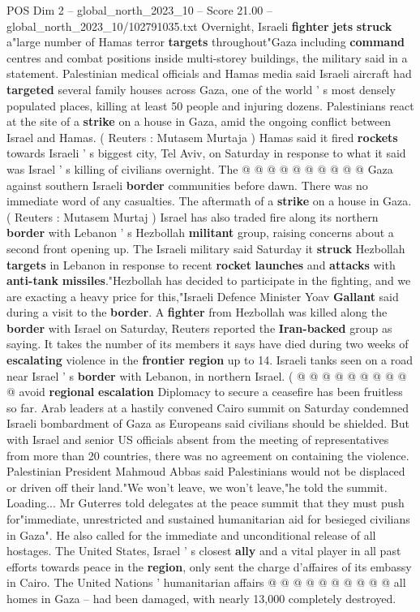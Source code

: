\begin{textsample}{POS Dim 2 – global\_north\_2023\_10 – Score 21.00 – global\_north\_2023\_10/102791035.txt}
Overnight, Israeli \textbf{fighter} \textbf{jets} \textbf{struck} a"large number of Hamas terror \textbf{targets} throughout"Gaza including \textbf{command} centres and combat positions inside multi-storey buildings, the military said in a statement.
Palestinian medical officials and Hamas media said Israeli aircraft had \textbf{targeted} several family houses across Gaza, one of the world ' s most densely populated places, killing at least 50 people and injuring dozens.
Palestinians react at the site of a \textbf{strike} on a house in Gaza, amid the ongoing conflict between Israel and Hamas. ( Reuters : Mutasem Murtaja ) Hamas said it fired \textbf{rockets} towards Israeli ' s biggest city, Tel Aviv, on Saturday in response to what it said was Israel ' s killing of civilians overnight.
The @ @ @ @ @ @ @ @ @ @ Gaza against southern Israeli \textbf{border} communities before dawn.
There was no immediate word of any casualties.
The aftermath of a \textbf{strike} on a house in Gaza. ( Reuters : Mutasem Murtaj ) Israel has also traded fire along its northern \textbf{border} with Lebanon ' s Hezbollah \textbf{militant} group, raising concerns about a second front opening up.
The Israeli military said Saturday it \textbf{struck} Hezbollah \textbf{targets} in Lebanon in response to recent \textbf{rocket} \textbf{launches} and \textbf{attacks} with \textbf{anti-tank} \textbf{missiles}."Hezbollah has decided to participate in the fighting, and we are exacting a heavy price for this,"Israeli Defence Minister Yoav \textbf{Gallant} said during a visit to the \textbf{border}.
A \textbf{fighter} from Hezbollah was killed along the \textbf{border} with Israel on Saturday, Reuters reported the \textbf{Iran-backed} group as saying.
It takes the number of its members it says have died during two weeks of \textbf{escalating} violence in the \textbf{frontier} \textbf{region} up to 14.
Israeli tanks seen on a road near Israel ' s \textbf{border} with Lebanon, in northern Israel. ( @ @ @ @ @ @ @ @ @ @ avoid \textbf{regional} \textbf{escalation} Diplomacy to secure a ceasefire has been fruitless so far.
Arab leaders at a hastily convened Cairo summit on Saturday condemned Israeli bombardment of Gaza as Europeans said civilians should be shielded.
But with Israel and senior US officials absent from the meeting of representatives from more than 20 countries, there was no agreement on containing the violence.
Palestinian President Mahmoud Abbas said Palestinians would not be displaced or driven off their land."We won't leave, we won't leave,"he told the summit.
Loading...
Mr Guterres told delegates at the peace summit that they must push for"immediate, unrestricted and sustained humanitarian aid for besieged civilians in Gaza".
He also called for the immediate and unconditional release of all hostages.
The United States, Israel ' s closest \textbf{ally} and a vital player in all past efforts towards peace in the \textbf{region}, only sent the charge d'affaires of its embassy in Cairo.
The United Nations ' humanitarian affairs @ @ @ @ @ @ @ @ @ @ all homes in Gaza -- had been damaged, with nearly 13,000 completely destroyed.


\end{textsample}
